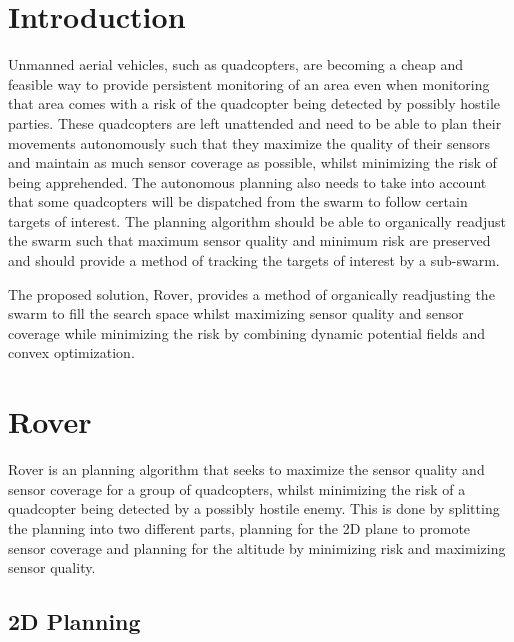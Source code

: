 \documentclass[12pt]{article}
\begin{document}
\maketitle

\newpage



\section{Introduction}

Unmanned aerial vehicles, such as quadcopters, are becoming a cheap and
feasible way to provide persistent monitoring of an area even when monitoring
that area comes with a risk of the quadcopter being detected by possibly
hostile parties. These quadcopters are left unattended and need to be able to
plan their movements autonomously such that they maximize the quality of their
sensors and maintain as much sensor coverage as possible, whilst minimizing the
risk of being apprehended. The autonomous planning also needs to take into
account that some quadcopters will be dispatched from the swarm to follow
certain targets of interest. The planning algorithm should be able to
organically readjust the swarm such that maximum sensor quality and minimum
risk are preserved and should provide a method of tracking the targets of
interest by a sub-swarm.

The proposed solution, Rover, provides a method of organically readjusting the
swarm to fill the search space whilst maximizing sensor quality and sensor
coverage while minimizing the risk by combining dynamic potential fields and
convex optimization.

\section{Rover}

Rover is an planning algorithm that seeks to maximize the sensor quality and
sensor coverage for a group of quadcopters, whilst minimizing the risk of a
quadcopter being detected by a possibly hostile enemy. This is done by
splitting the planning into two different parts, planning for the 2D plane to
promote sensor coverage and planning for the altitude by minimizing risk and
maximizing sensor quality.

\subsection{2D Planning}
\end{document}
